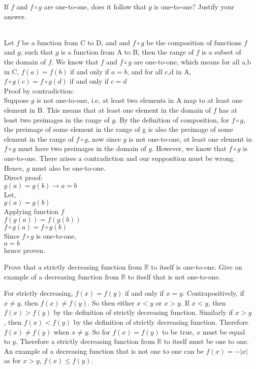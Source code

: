\documentclass[addpoints]{exam}
\begin{document}
\begin{questions}
\question[5] If $f$ and $f \circ g$ are one-to-one, does it follow that $g$ is one-to-one? Justify your answer.
  \begin{solution}\\
    Let $f$ be a function from C to D, and and $f \circ g$ be the composition of functions $f$ and $g$, such that $g$ is a function from A to B, 
    then the range of $f$ is a subset of the domain of $f$. We know that $f$ and $f \circ g$ are one-to-one, which means for all a,b in C, 
    $f(a)=f(b)$ if and only if $a = b$, and for all c,d in A, $f \circ g(c)=f \circ g(d)$ if and only if $c = d$\\
    Proof by contradiction:\\
    Suppose $g$ is not one-to-one, i.e, at least two elements in A map to at least one element in B. This means that at least one element in 
    the domain of $f$ has at least two preimages in the range of $g$. By the definition of composition, for $f \circ g$, the preimage of some element 
    in the range of g is also the preimage of some element in the range of $f \circ g$, 
    now since $g$ is not one-to-one, at least one element in $f \circ g$ must have two preimages in the domain of $g$.
    However, we know that $f \circ g$ is one-to-one. There arises a contradiction and our supposition must be wrong. Hence, $g$ must also be one-to-one.\\
    Direct proof:\\
    $g(a) = g(b) \rightarrow a = b$\\
    Let,    \\
    $g(a) = g(b)$\\
    Applying function $f$\\
            $f(g(a)) = f(g(b))$\\
            $f \circ g (a) = f \circ g (b)$\\
    Since $f \circ g$ is one-to-one,\\
            $a = b$\\
    hence proven.
  \end{solution}

\question[5] Prove that a strictly decreasing function from $\mathbb{R}$ to itself is one-to-one. Give an example of a decreasing function from $\mathbb{R}$ to itself that is not one-to-one.
  \begin{solution}
    For strictly decreasing, $f(x) = f(y)$ if and only if $x = y$. Contrapositively, if $x \neq y$, then $f(x) \neq f(y)$.
    So then either $x < y$ or $x > y$.
    If $x < y$, then $f(x) > f(y)$ by the definition of strictly decreasing function. Similarly if $x > y$, then $f(x) < f(y)$ by
    the definition of strictly decreasing function. Therefore $f(x) \neq f(y)$ when $x \neq y$. So for $f(x) = f(y)$ to be true,
    $x$ must be equal to $y$. Therefore a strictly decreasing function from $\mathbb{R}$ to itself must be one to one. \\
    An example of a decreasing function that is not one to one can be $f(x) = - |x|$ as for $x > y$, $f(x) \le f(y)$.
  \end{solution}
  

\end{questions}
\end{document}
